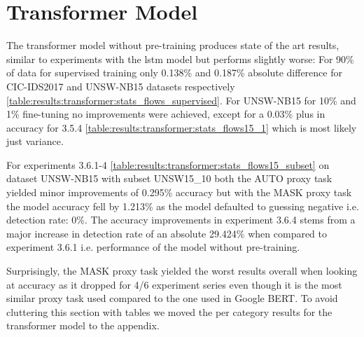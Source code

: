 

\FloatBarrier

\section{Transformer Model} \label{sec:results:transformer}



The transformer model without pre-training produces state of the art results, similar to experiments with the \gls{lstm} model but  performs slightly worse: For 90\% of data for supervised training only 0.138\% and 0.187\% absolute difference for CIC-IDS2017 and UNSW-NB15 datasets respectively \ref{table:results:transformer:stats_flows_supervised}.
For UNSW-NB15 for 10\% and 1\% fine-tuning no improvements were achieved, except for a 0.03\% plus in accuracy for 3.5.4 \ref{table:results:transformer:stats_flows15_1} which is most likely just variance. \par



For experiments 3.6.1-4 \ref{table:results:transformer:stats_flows15_subset} on dataset UNSW-NB15 with subset UNSW15\_10 both the AUTO proxy task yielded minor improvements of 0.295\% accuracy but with the MASK proxy task the model accuracy fell by 1.213\% as the model defaulted to guessing negative i.e. detection rate: 0\%. The accuracy improvements in experiment 3.6.4 stems from a major increase in detection rate of an absolute 29.424\% when compared to experiment 3.6.1 i.e. performance of the model without pre-training. \par
Surprisingly, the MASK proxy task yielded the worst results overall when looking at accuracy as it dropped for 4/6 experiment series even though it is the most similar proxy task used compared to the one used in Google BERT. To avoid cluttering this section with tables we moved the per category results for the transformer model to the appendix.








